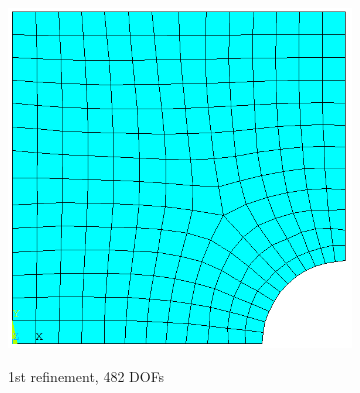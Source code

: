\begin{figure}[h!]
\begin{subfigure}[b]{0.48\linewidth}
{            \includegraphics{adaptivity/ex_images/ex_chole_ansys_1_241.png}
        }
        \caption{1st refinement, 482 DOFs}
    \end{subfigure}
    \begin{subfigure}[b]{0.48\linewidth}
        \centering
\end{subfigure}
\end{figure}
